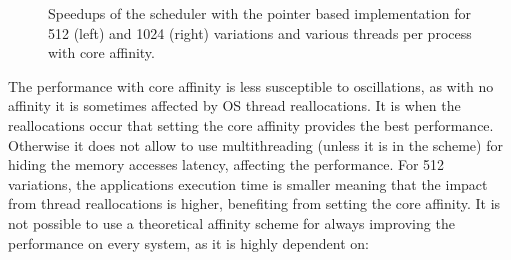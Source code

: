 \begin{figure}[!htp]
	\begin{center}
		\caption{Speedups of the scheduler with the pointer based implementation for 512 (left) and 1024 (right) variations and various threads per process with core affinity.}
		\label{fig:sched_aff}
	\end{center}
\end{figure}

The performance with core affinity is less susceptible to oscillations, as with no affinity it is sometimes affected by OS thread reallocations. It is when the reallocations occur that setting the core affinity provides the best performance. Otherwise it does not allow to use multithreading (unless it is in the scheme) for hiding the memory accesses latency, affecting the performance. For 512 variations, the applications execution time is smaller meaning that the impact from thread reallocations is higher, benefiting from setting the core affinity. It is not possible to use a theoretical affinity scheme for always improving the performance on every system, as it is highly dependent on:

